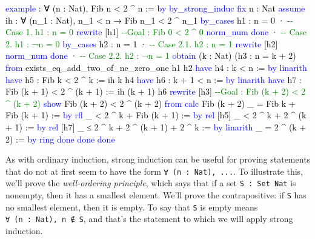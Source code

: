 \documentclass[
  letterpaper,
  DIV=11,
  numbers=noendperiod]{scrreprt}
\newenvironment{Shaded}{\begin{snugshade}}{\end{snugshade}}
\newcommand{\CommentTok}[1]{\textcolor[rgb]{0.37,0.37,0.37}{#1}}
\newcommand{\KeywordTok}[1]{\textcolor[rgb]{0.00,0.23,0.31}{#1}}
\newcommand{\NormalTok}[1]{\textcolor[rgb]{0.00,0.23,0.31}{#1}}
\renewcommand{\NormalTok}[1]{\textcolor[HTML]{000000}{#1}}
\renewcommand{\KeywordTok}[1]{\textcolor[HTML]{0000FF}{#1}}
\renewcommand{\CommentTok}[1]{\textcolor[HTML]{008000}{#1}}
\theoremstyle{remark}
\begin{document}
\begin{Shaded}
\begin{Highlighting}[]
\KeywordTok{example}\NormalTok{ : ∀ (n : Nat), Fib n \textless{} 2 \^{} n := }\KeywordTok{by}
  \KeywordTok{by\_strong\_induc}
  \KeywordTok{fix}\NormalTok{ n : Nat}
  \KeywordTok{assume}\NormalTok{ ih : ∀ (n\_1 : Nat), n\_1 \textless{} n → Fib n\_1 \textless{} 2 \^{} n\_1}
  \KeywordTok{by\_cases}\NormalTok{ h1 : n = 0}
\NormalTok{  · }\CommentTok{{-}{-} Case 1. h1 : n = 0}
    \KeywordTok{rewrite}\NormalTok{ [h1]   }\CommentTok{{-}{-}Goal : Fib 0 \textless{} 2 \^{} 0}
    \KeywordTok{norm\_num}
    \KeywordTok{done}
\NormalTok{  · }\CommentTok{{-}{-} Case 2. h1 : ¬n = 0}
    \KeywordTok{by\_cases}\NormalTok{ h2 : n = 1}
\NormalTok{    · }\CommentTok{{-}{-} Case 2.1. h2 : n = 1}
      \KeywordTok{rewrite}\NormalTok{ [h2]}
      \KeywordTok{norm\_num}
      \KeywordTok{done}
\NormalTok{    · }\CommentTok{{-}{-} Case 2.2. h2 : ¬n = 1}
      \KeywordTok{obtain}\NormalTok{ (k : Nat) (h3 : n = k + 2) }\KeywordTok{from}
\NormalTok{        exists\_eq\_add\_two\_of\_ne\_zero\_one h1 h2}
      \KeywordTok{have}\NormalTok{ h4 : k \textless{} n := }\KeywordTok{by} \KeywordTok{linarith}
      \KeywordTok{have}\NormalTok{ h5 : Fib k \textless{} 2 \^{} k := ih k h4}
      \KeywordTok{have}\NormalTok{ h6 : k + 1 \textless{} n := }\KeywordTok{by} \KeywordTok{linarith}
      \KeywordTok{have}\NormalTok{ h7 : Fib (k + 1) \textless{} 2 \^{} (k + 1) := ih (k + 1) h6}
      \KeywordTok{rewrite}\NormalTok{ [h3]            }\CommentTok{{-}{-}Goal : Fib (k + 2) \textless{} 2 \^{} (k + 2)}
      \KeywordTok{show}\NormalTok{ Fib (k + 2) \textless{} 2 \^{} (k + 2) }\KeywordTok{from}
        \KeywordTok{calc}\NormalTok{ Fib (k + 2)}
\NormalTok{          \_ = Fib k + Fib (k + 1) := }\KeywordTok{by} \KeywordTok{rfl}
\NormalTok{          \_ \textless{} 2 \^{} k + Fib (k + 1) := }\KeywordTok{by} \KeywordTok{rel}\NormalTok{ [h5]}
\NormalTok{          \_ \textless{} 2 \^{} k + 2 \^{} (k + 1) := }\KeywordTok{by} \KeywordTok{rel}\NormalTok{ [h7]}
\NormalTok{          \_ ≤ 2 \^{} k + 2 \^{} (k + 1) + 2 \^{} k := }\KeywordTok{by} \KeywordTok{linarith}
\NormalTok{          \_ = 2 \^{} (k + 2) := }\KeywordTok{by} \KeywordTok{ring}
      \KeywordTok{done}
    \KeywordTok{done}
  \KeywordTok{done}
\end{Highlighting}
\end{Shaded}

As with ordinary induction, strong induction can be useful for proving
statements that do not at first seem to have the form
\texttt{∀\ (n\ :\ Nat),\ ...}. To illustrate this, we'll prove the
\emph{well-ordering principle}, which says that if a set
\texttt{S\ :\ Set\ Nat} is nonempty, then it has a smallest element.
We'll prove the contrapositive: if \texttt{S} has no smallest element,
then it is empty. To say that \texttt{S} is empty means
\texttt{∀\ (n\ :\ Nat),\ n\ ∉\ S}, and that's the statement to which we
will apply strong induction.
\end{document}
